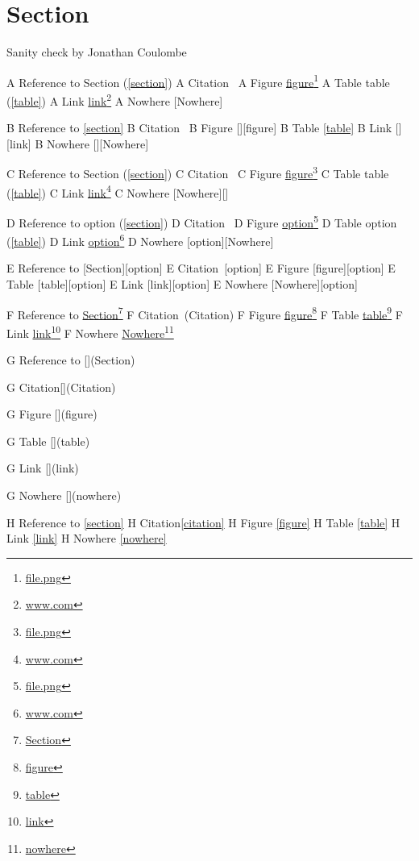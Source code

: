 
\def\mytitle{MultiMarkdown Sanity Test}


\part{Section}
\label{section}

Sanity check by Jonathan Coulombe

A Reference to Section (\autoref{section})
A Citation~\citep{Citation}
A Figure \href{file.png}{figure}\footnote{\href{file.png}{file.png}}
A Table table (\autoref{table})
A Link \href{www.com}{link}\footnote{\href{www.com}{www.com}}
A Nowhere [Nowhere]

B Reference to \autoref{section}
B Citation~\citep{Citation}
B Figure [][figure]
B Table \autoref{table}
B Link [][link]
B Nowhere [][Nowhere]

C Reference to Section (\autoref{section})
C Citation~\citep{Citation}
C Figure \href{file.png}{figure}\footnote{\href{file.png}{file.png}}
C Table table (\autoref{table})
C Link \href{www.com}{link}\footnote{\href{www.com}{www.com}}
C Nowhere [Nowhere][]

D Reference to option (\autoref{section})
D Citation~\citep[option]{Citation}
D Figure \href{file.png}{option}\footnote{\href{file.png}{file.png}}
D Table option (\autoref{table})
D Link \href{www.com}{option}\footnote{\href{www.com}{www.com}}
D Nowhere [option][Nowhere]

E Reference to [Section][option]
E Citation~\citep{Citation}[option]
E Figure [figure][option]
E Table [table][option]
E Link [link][option]
E Nowhere [Nowhere][option]

F Reference to \href{Section}{Section}\footnote{\href{Section}{Section}}
F Citation~\citep{Citation}(Citation)
F Figure \href{figure}{figure}\footnote{\href{figure}{figure}}
F Table \href{table}{table}\footnote{\href{table}{table}}
F Link \href{link}{link}\footnote{\href{link}{link}}
F Nowhere \href{nowhere}{Nowhere}\footnote{\href{nowhere}{nowhere}}

G Reference to [](Section)

G Citation[](Citation)

G Figure [](figure)

G Table [](table)

G Link [](link)

G Nowhere [](nowhere)

H Reference to \autoref{section}
H Citation\autoref{citation}
H Figure \autoref{figure}
H Table \autoref{table}
H Link \autoref{link}
H Nowhere \autoref{nowhere}

